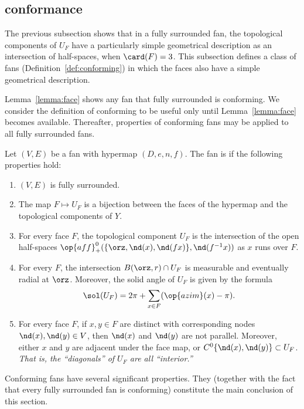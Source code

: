 \subsection{conformance}\label{sec:conformance}


The previous subsection shows that in a fully surrounded fan, the topological
components of $U_F$ have a particularly simple geometrical description as
an intersection of half-spaces, when $\card(F)=3$.  This subsection defines
a class of fans (Definition~\ref{def:conforming}) in which the faces also have
a  simple geometrical description.

Lemma~\ref{lemma:face} shows any fan that fully surrounded is
conforming.  We consider the definition of conforming to be
useful only until Lemma~\ref{lemma:face} becomes available.
Thereafter, properties of conforming fans may be applied to all fully
surrounded fans.

\begin{definition}[conforming]\label{def:conforming}
Let $(V,E)$ be a fan with hypermap $(D,e,n,f)$.  The fan is
 if the following properties hold:
\begin{enumerate}
\item {} $(V,E)$ is fully surrounded.
\item {} The map $F\mapsto U_F$ is a bijection between
the faces of the hypermap and the topological components of $Y$.
\item {} For every face $F$, the topological component
$U_F$ is the intersection of the open half-spaces
$\op{aff}_+^0(\{\orz,\nd(x),\nd({f x})\},\nd(f^{-1} x))$ as $x$ runs over
$F$.\label{halfspace:conformance}
\item {} For every $F$, the intersection
$B(\orz,r)\cap U_F$ is measurable and eventually radial at $\orz$.
Moreover, the solid angle of $U_F$ is given by the formula
\[ 
\sol(U_F) = 2\pi + \sum_{x\in F}(\op{azim}(x)-\pi).
\] 
\item {} For every face $F$, if $x,y\in F$ are distinct
with corresponding nodes $\nd(x),\nd(y)\in V$, then $\nd(x)$ and
$\nd(y)$ are not parallel.  Moreover, either $x$ and $y$ are adjacent under
the face map, or $C^0\{\nd(x),\nd(y)\}\subset U_F$.  {\it That is, the
``diagonals'' of $U_F$ are all ``interior.''}
\end{enumerate}
\end{definition}


Conforming fans have several significant properties.   They
(together with the fact that every fully surrounded fan is conforming) constitute
the main conclusion of this section.  

